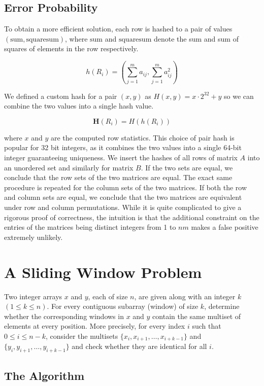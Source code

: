 \subsection{Error Probability}

To obtain a more efficient solution, each row is hashed to a pair of values 
$(\text{sum}, \text{squaresum})$, where $\text{sum}$ and $\text{squaresum}$ denote the 
sum and sum of squares of elements in the row respectively. 

\[
h(R_i) = \left(\sum_{j=1}^{m} a_{ij}, \sum_{j=1}^{m} a_{ij}^2\right)
\]

We defined a custom hash for a pair $(x,y)$ as $H(x,y) = x \cdot 2^{32} + y$ so we can combine the two values 
into a single hash value. 

\[
\mathbf{H}(R_i) = H(h(R_i))
\]

where $x$ and $y$ are the computed row statistics. This choice of pair hash is popular 
for 32 bit integers, as it combines the two values into a single 64-bit integer guaranteeing uniqueness. We 
insert the hashes of all rows of matrix \(A\) into an unordered set and similarly for matrix \(B\). 
If the two sets are equal, we conclude that the row sets of the two matrices are equal. The exact same 
procedure is repeated for the column sets of the two matrices. If both the row and column sets are equal, 
we conclude that the two matrices are equivalent under row and column permutations. While it is quite 
complicated to give a rigorous proof of correctness, the intuition is that the additional constraint on the 
entries of the matrices being distinct integers from 1 to \(nm\) makes a false positive extremely unlikely.\\

\section{A Sliding Window Problem}
Two integer arrays $x$ and $y$, each of size $n$, are given along with an integer $k$ $(1 \le k \le n)$. For 
every contiguous subarray (window) of size $k$, determine whether the 
corresponding windows in $x$ and $y$ contain the same multiset of elements at every position. More precisely, 
for every index $i$ such that $0 \le i \le n-k$, consider the multisets $\{x_i, x_{i+1}, 
\dots, x_{i+k-1}\}$ and $\{y_i, y_{i+1}, \dots, y_{i+k-1}\}$ and check whether they 
are identical for all $i$.


\subsection{The Algorithm}

